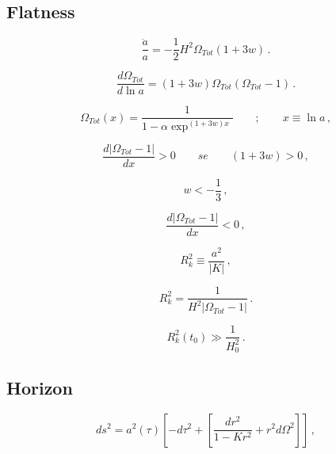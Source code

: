 \subsection{Flatness}
\label{subsection:1.5.1}

\begin{equation}
\frac{\ddot{a}}{a} = -\frac{1}{2}H^2 \Omega_{Tot} (1+3 w) \, .
\label{equation:1.5.1}
\end{equation}

\begin{equation}
\dfrac{d \Omega_{Tot}}{d \ln a} = (1+3 w)\Omega_{Tot} (\Omega_{Tot} - 1) \, .
\label{equation:1.5.2}
\end{equation}

\begin{equation}
\Omega_{Tot} (x) = \frac{1}{1-\alpha \exp^{(1+3 w)x}} \qquad ; \qquad x \equiv \ln a \, ,
\label{equation:1.5.3} 
\end{equation}   
 
\begin{equation}
\dfrac{d |\Omega_{Tot} - 1 |}{d x} > 0 \qquad se \qquad (1+ 3 w) > 0 \, ,
\label{equation:1.5.4}
\end{equation}   

\begin{equation}
w < -\frac{1}{3}\, ,
\label{equation:1.5.5}
\end{equation}

\begin{equation}
\dfrac{d |\Omega_{Tot} - 1 |}{d x} < 0 \,,
\label{equation:1.5.6}
\end{equation}

\begin{equation}
R_k^2 \equiv \frac{a^2}{|K|}\, ,
\label{equation:1.5.7}
\end{equation}

\begin{equation}
R_k^2 = \frac{1}{H^2 |\Omega_{Tot} -1 |} \, .
\label{equation:1.5.8}
\end{equation}

\begin{equation}
R_k^2 (t_0) \gg \frac{1}{H_0^2}\, .
\label{equation:1.5.9}
\end{equation}

\subsection{Horizon}
\label{subsection:1.5.2}

\begin{equation}
ds^2=a^2(\tau)\left[-d\tau^2 + \left[\frac{dr^2}{1-K r^2}+r^2d\Omega^2\right]\right]\, ,
\label{equation:1.5.10}
\end{equation} 


